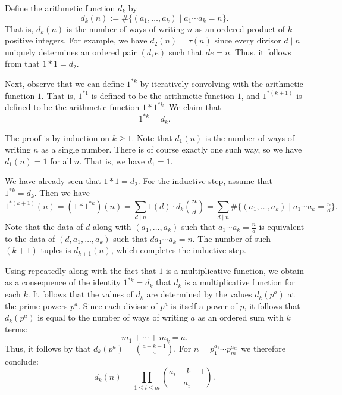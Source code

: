 \begin{example}\label{example:convolution-powers-1}
  Define the arithmetic function $d_k$ by
  \begin{equation*}
    d_k(n) := \#\{(a_1,\ldots,a_k) \mid a_1\cdots a_k=n\}.
  \end{equation*}
  That is, $d_k(n)$ is the number of ways of writing $n$ as an ordered product of $k$ positive integers. For example, we have $d_2(n)=\tau(n)$ since every divisor $d\mid n$ uniquely determines an ordered pair $(d,e)$ such that $de=n$. Thus, it follows from  that $1\ast 1=d_2$.

  Next, observe that we can define $1^{\ast k}$ by iteratively convolving with the arithmetic function $1$. That is, $1^{\ast 1}$ is defined to be the arithmetic function $1$, and $1^{\ast(k+1)}$ is defined to be the arithmetic function $1\ast 1^{\ast k}$. We claim that
  \begin{equation*}
    1^{\ast k}=d_k.
  \end{equation*}

  The proof is by induction on $k\geq 1$. Note that $d_1(n)$ is the number of ways of writing $n$ as a single number. There is of course exactly one such way, so we have $d_1(n)=1$ for all $n$. That is, we have $d_1=1$.

  We have already seen that $1\ast 1=d_2$. For the inductive step, assume that $1^{\ast k}=d_k$. Then we have
  \begin{equation*}
    1^{\ast(k+1)}(n) = (1\ast 1^{\ast k})(n) =
    \sum_{d\mid n}1(d)\cdot d_k\left(\frac{n}{d}\right)=\sum_{d\mid n}\#\{(a_1,\ldots,a_k)\mid a_1\cdots a_k=\tfrac{n}{d}\}.
  \end{equation*}
  Note that the data of $d$ along with $(a_1,\ldots,a_k)$ such that $a_1\cdots a_k=\frac{n}{d}$ is equivalent to the data of $(d,a_1,\ldots,a_k)$ such that $da_1\cdots a_k=n$. The number of such $(k+1)$-tuples is $d_{k+1}(n)$, which completes the inductive step.

  Using  repeatedly along with the fact that $1$ is a multiplicative function, we obtain as a consequence of the identity $1^{\ast k}=d_k$ that $d_k$ is a multiplicative function for each $k$. It follows that the values of $d_k$ are determined by the values $d_k(p^a)$ at the prime powers $p^a$. Since each divisor of $p^a$ is itself a power of $p$, it follows that $d_k(p^a)$ is equal to the number of ways of writing $a$ as an ordered sum with $k$ terms:
  \begin{equation*}
    m_1+\cdots+m_k=a.
  \end{equation*}
  Thus, it follows by  that $d_k(p^a)=\binom{a+k-1}{a}$. For $n=p_1^{a_1}\cdots p_m^{a_m}$ we therefore conclude:
  \begin{equation*}
    d_k(n) = \prod_{1\leq i\leq m}\binom{a_i+k-1}{a_i}.
  \end{equation*}
\end{example}

